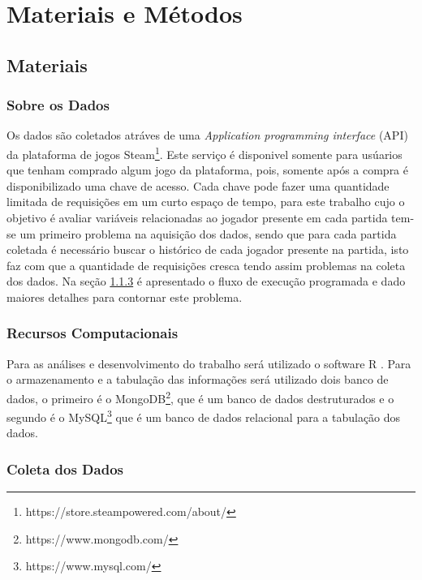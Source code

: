 \documentclass[
12pt,				%
openright,			%
oneside,			%
a4paper,			%
english,			%
brazil,				%
]{abntex2}
\begin{document}
\chapter{Materiais e Métodos}
\label{cha:materiaisemetodos}

\section{Materiais}
\label{sec:materiais}

\subsection{Sobre os Dados}

Os dados são coletados atráves de uma \emph{Application programming interface}
(API) da plataforma de jogos Steam\footnote{https://store.steampowered.com/about/}.
Este serviço é disponivel somente para usúarios que tenham comprado algum jogo
da plataforma, pois, somente após a compra é disponibilizado uma chave de
acesso. Cada chave pode fazer uma quantidade limitada de requisições em um curto
espaço de tempo, para este trabalho cujo o objetivo é avaliar variáveis
relacionadas ao jogador presente em cada partida tem-se um primeiro problema na
aquisição dos dados, sendo que para cada partida coletada é necessário buscar o
histórico de cada jogador presente na partida, isto faz com que a quantidade de
requisições cresca tendo assim problemas na coleta dos dados. Na seção \ref{sec:coletadosdados}
 é apresentado o fluxo de execução programada e dado
maiores detalhes para contornar este problema.

\subsection{Recursos Computacionais}

Para as análises e desenvolvimento do trabalho será utilizado o software R \cite{rcoreteam}.
Para o armazenamento e a tabulação das informações será
utilizado dois banco de dados, o primeiro é o
MongoDB\footnote{https://www.mongodb.com/}, que é um banco de dados
destruturados e o segundo é o MySQL\footnote{https://www.mysql.com/} que é
um banco de dados relacional para a tabulação dos dados.


\subsection{Coleta dos Dados}
\label{sec:coletadosdados}
\end{document}
